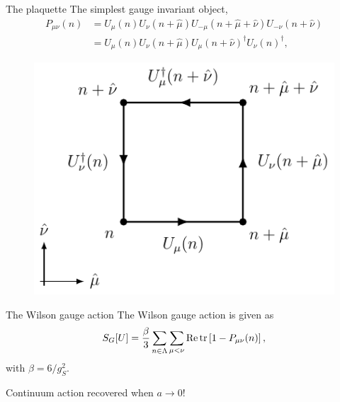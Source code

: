 \documentclass[10pt,show notes on second screen]{beamer}
\begin{document}
\begin{frame}{The plaquette}
The simplest gauge invariant object,
\begin{align*}
    P_{\mu\nu}(n) &= U_\mu(n) U_{\nu}(n+\hat{\mu}) U_{-\mu}(n+\hat{\mu}+\hat{\nu}) U_{-\nu} (n+\hat{\nu}) \nonumber \\
    &= U_\mu(n) U_{\nu}(n+\hat{\mu}) U_{\mu}(n+\hat{\nu})^\dagger U_{\nu} (n)^\dagger,
\end{align*}
\begin{figure}
    \centering
    \includegraphics[scale=1]{../figures/illustrations/lqcd/plaquette/plaquette}
\end{figure}
\end{frame}

\begin{frame}{The Wilson gauge action}
The Wilson gauge action is given as
\begin{align}
    S_G[U] = \frac{\beta}{3} \sum_{n\in\Lambda} \sum_{\mu<\nu} \operatorname{Re} \mathrm{tr} \left[ 1 - P_{\mu\nu}(n) \right],
\end{align}
with $\beta=6/g_S^2$.

Continuum action recovered when $a \rightarrow 0$!
\end{frame}

\end{document}
